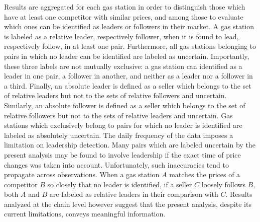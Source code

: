 \documentclass[english]{article}
\begin{document}
Results are aggregated for each gas station in order to distinguish those which have at least one competitor with similar prices, and among those to evaluate which ones can be identified as leaders or followers in their market. A gas station is labeled as a relative leader, respectively follower, when it is found to lead, respectively follow, in at least one pair. Furthermore, all gas stations belonging to pairs in which no leader can be identified are labeled as uncertain. Importantly, these three labels are not mutually exclusive: a gas station can identified as a leader in one pair, a follower in another, and neither as a leader nor a follower in a third. Finally, an absolute leader is defined as a seller which belongs to the set of relative leaders but not to the sets of relative followers and uncertain. Similarly, an absolute follower is defined as a seller which belongs to the set of relative followers but not to the sets of relative leaders and uncertain. Gas stations which exclusively belong to pairs for which no leader is identified are labeled as absolutely uncertain. The daily frequency of the data imposes a limitation on leadership detection. Many pairs which are labeled uncertain by the present analysis may be found to involve leadership if the exact time of price changes was taken into account. Unfortunately, such inaccuracies tend to propagate across observations. When a gas station $A$ matches the prices of a competitor $B$ so closely that no leader is identified, if a seller $C$ loosely follows $B$, both $A$ and $B$ are labeled as relative leaders in their comparison with $C$. Results analyzed at the chain level however suggest that the present analysis, despite its current limitations, conveys meaningful information.
\end{document}
